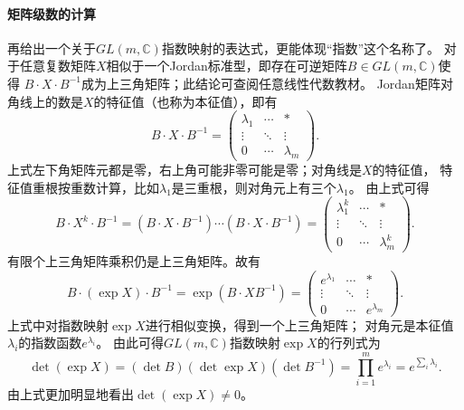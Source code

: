 \paragraph{矩阵级数的计算}
再给出一个关于$GL(m,\mathbb{C})$指数映射的表达式，更能体现“指数”这个名称了。
对于任意复数矩阵$X$相似于一个Jordan标准型，即存在可逆矩阵$B\in GL(m,\mathbb{C})$使得
$B\cdot X \cdot B^{-1}$成为上三角矩阵；此结论可查阅任意线性代数教材。
Jordan矩阵对角线上的数是$X$的特征值（也称为本征值），即有
\begin{equation}
    B\cdot X \cdot B^{-1} = 
    \begin{pmatrix}
        \lambda_1 & \cdots &*\\
        \vdots & \ddots &\vdots \\
        0 &\cdots & \lambda_m
    \end{pmatrix}.
\end{equation}
上式左下角矩阵元都是零，右上角可能非零可能是零；对角线是$X$的特征值，
特征值重根按重数计算，比如$\lambda_1$是三重根，则对角元上有三个$\lambda_1$。
由上式可得
\begin{equation*}
    B\cdot X^k \cdot B^{-1} = 
    (B\cdot X \cdot B^{-1})\cdots (B\cdot X \cdot B^{-1})=
    \begin{pmatrix}
        \lambda_1^k & \cdots &*\\
        \vdots & \ddots &\vdots \\
        0 &\cdots & \lambda_m^k
    \end{pmatrix} .
\end{equation*}
有限个上三角矩阵乘积仍是上三角矩阵。故有
\begin{equation}\label{chlg:eqn_BexpXB}
    B\cdot (\exp X) \cdot B^{-1} = \exp(B\cdot X B^{-1})=
    \begin{pmatrix}
        e^{\lambda_1} & \cdots &*\\
        \vdots & \ddots &\vdots \\
        0 &\cdots & e^{\lambda_m}
    \end{pmatrix}.
\end{equation}
上式中对指数映射$\exp X$进行相似变换，得到一个上三角矩阵；
对角元是本征值$\lambda_i$的指数函数$e^{\lambda_i}$。
由此可得$GL(m,\mathbb{C})$指数映射$\exp X$的行列式为
\begin{equation}\label{chlg:eqn_detexpX}
    \det (\exp X) = (\det B) (\det \exp X) (\det B^{-1})
    = \prod_{i=1}^m e^{\lambda_i} = e^{\sum_i {\lambda_i}} .
\end{equation}
由上式更加明显地看出$\det (\exp X) \neq 0$。

